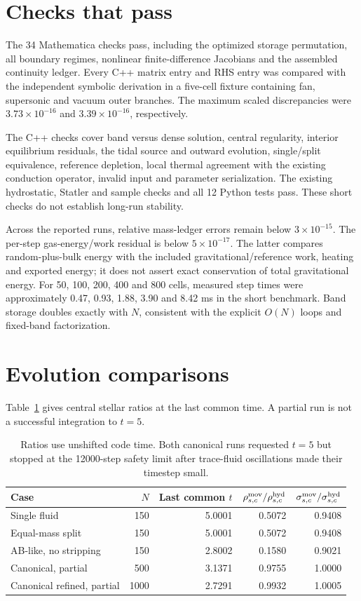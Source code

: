 \documentclass[11pt]{article}
\begin{document}
\section{Checks that pass}
The 34 Mathematica checks pass, including the optimized storage permutation,
all boundary regimes, nonlinear finite-difference Jacobians and the assembled
continuity ledger. Every C++ matrix entry and RHS entry was compared with
the independent symbolic derivation in a five-cell fixture containing
fan, supersonic and vacuum outer branches. The maximum scaled discrepancies
were $3.73\times10^{-16}$ and $3.39\times10^{-16}$, respectively.

The C++ checks cover band versus dense solution, central regularity,
interior equilibrium residuals, the tidal source and outward evolution,
single/split equivalence, reference depletion, local thermal agreement with
the existing conduction operator, invalid input and parameter serialization.
The existing hydrostatic, Statler and sample checks and all 12 Python tests
pass. These short checks do not establish long-run stability.

Across the reported runs, relative mass-ledger errors remain below
$3\times10^{-15}$. The per-step gas-energy/work residual is below
$5\times10^{-17}$. The latter compares random-plus-bulk energy with the
included gravitational/reference work, heating and exported energy;
it does not assert exact conservation of total gravitational energy.
For 50, 100, 200, 400 and 800 cells, measured step times were approximately
0.47, 0.93, 1.88, 3.90 and 8.42 ms in the short benchmark. Band storage
doubles exactly with $N$, consistent with the explicit $O(N)$ loops and
fixed-band factorization.

\section{Evolution comparisons}
Table~\ref{tab:results} gives central stellar ratios at the last common
time. A partial run is not a successful integration to $t=5$.
\begin{table}[ht]
\centering
\begin{tabular}{lrrrr}
\toprule
Case & $N$ & Last common $t$ & $\rho_{s,c}^{\rm mov}/\rho_{s,c}^{\rm hyd}$
& $\sigma_{s,c}^{\rm mov}/\sigma_{s,c}^{\rm hyd}$\\
\midrule
Single fluid &150&5.0001&0.5072&0.9408\\
Equal-mass split &150&5.0001&0.5072&0.9408\\
AB-like, no stripping &150&2.8002&0.1580&0.9021\\
Canonical, partial &500&3.1371&0.9755&1.0000\\
Canonical refined, partial &1000&2.7291&0.9932&1.0005\\
\bottomrule
\end{tabular}
\caption{Ratios use unshifted code time. Both canonical runs requested $t=5$
but stopped at the 12000-step safety limit after trace-fluid oscillations
made their timestep small.}\label{tab:results}
\end{table}
\end{document}
